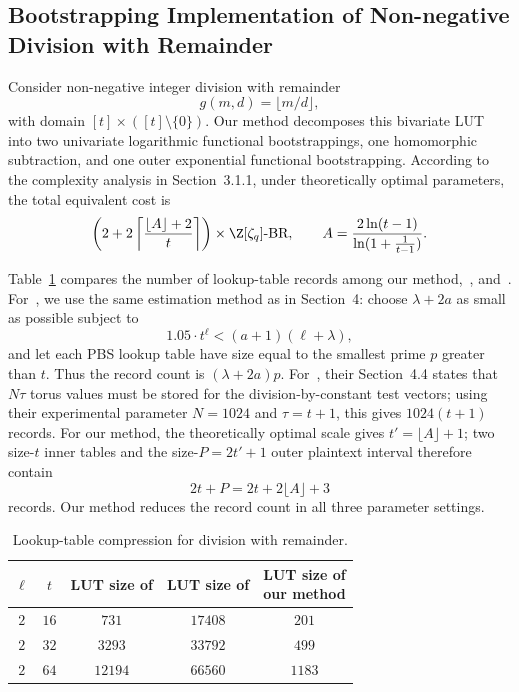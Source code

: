 \subsection{Bootstrapping Implementation of Non-negative Division with Remainder}

Consider non-negative integer division with remainder
\[
g(m,d)=\lfloor m/d\rfloor,
\]
with domain $[t]\times([t]\setminus\{0\})$. Our method decomposes this
bivariate LUT into two univariate logarithmic functional bootstrappings, one
homomorphic subtraction, and one outer exponential functional bootstrapping.
According to the complexity analysis in Section~3.1.1, under theoretically
optimal parameters, the total equivalent cost is
\[
\left(
2+2\left\lceil\frac{\lfloor A\rfloor+2}{t}\right\rceil
\right)\times\Z[\zeta_q]\text{-BR},
\qquad
A=\frac{2\ln(t-1)}{\ln(1+\frac{1}{t-1})}.
\]

Table~\ref{tab:div_record} compares the number of lookup-table records among
our method,~\cite{BBR26}, and~\cite{OKC21}. For~\cite{BBR26}, we use the same
estimation method as in Section~4: choose $\lambda+2a$ as small as possible
subject to
\[
1.05\cdot t^\ell<(a+1)(\ell+\lambda),
\]
and let each PBS lookup table have size equal to the smallest prime $p$ greater
than $t$. Thus the record count is $(\lambda+2a)p$. For~\cite{OKC21}, their
Section~4.4 states that $N\tau$ torus values must be stored for the
division-by-constant test vectors; using their experimental parameter $N=1024$
and $\tau=t+1$, this gives $1024(t+1)$ records. For our method, the theoretically
optimal scale gives $t'=\lfloor A\rfloor+1$; two size-$t$ inner tables and the
size-$P=2t'+1$ outer plaintext interval therefore contain
\[
2t+P=2t+2\lfloor A\rfloor+3
\]
records. Our method reduces the record count in all three parameter settings.

\begin{table}[!tbp]
  \centering
  \small
  \caption{Lookup-table compression for division with remainder.}
  \label{tab:div_record}
  \begin{tabular}{c|c|c|c|c}
    \hline
    $\ell$ & $t$
    & \makecell{LUT size of\\\cite{BBR26}}
    & \makecell{LUT size of\\\cite{OKC21}}
    & \makecell{LUT size of\\our method} \\
    \hline
    $2$ & $16$ & $731$   & $17408$ & $201$ \\
    $2$ & $32$ & $3293$  & $33792$ & $499$ \\
    $2$ & $64$ & $12194$ & $66560$ & $1183$ \\
    \hline
  \end{tabular}
\end{table}


